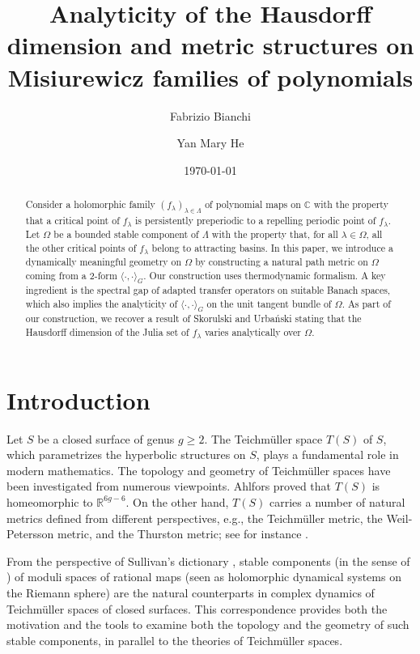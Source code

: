 \documentclass[11pt]{amsart}
\title{Analyticity of the Hausdorff dimension and 
metric structures on Misiurewicz families of polynomials}
\author{Fabrizio Bianchi}
\author{Yan Mary He}
\date{\today}
\theoremstyle{plain}
\theoremstyle{definition}
\theoremstyle{remark}
\begin{document}
\begin{abstract}
Consider a holomorphic
family
$(f_\lambda)_{\lambda \in \Lambda}$
of polynomial
maps on $\mathbb C$
with the property that a critical point of $f_\lambda$ is persistently preperiodic to a repelling periodic point of $f_\lambda$.
Let $\Omega$ be a bounded stable component of $\Lambda$ with the property that, for all $\lambda \in \Omega$, all the other critical points of $f_\lambda$
belong to attracting basins. 
In this paper, we introduce a dynamically meaningful 
geometry on $\Omega$ by constructing a natural path metric on $\Omega$ coming from a
2-form $\langle \cdot, \cdot \rangle_G$. Our construction uses thermodynamic formalism. A key ingredient is the
spectral gap of adapted transfer operators on suitable Banach spaces, which also implies the analyticity of $\langle \cdot, \cdot \rangle_G$ on the unit tangent bundle of $\Omega$.
As part of our construction, we recover
a result of Skorulski and
Urba{\'n}ski stating
that the Hausdorff dimension of the Julia set of $f_\lambda$
varies analytically over $\Omega$.
\end{abstract}

\maketitle

\section{Introduction}
Let $S$ be a closed surface of genus 
$g \geq 2$.
The Teichm\"uller space $T(S)$ of $S$, which parametrizes the hyperbolic structures on $S$, plays a fundamental role in modern mathematics.
The topology and geometry of
Teichm\"uller spaces
have been investigated from numerous viewpoints. Ahlfors 
\cite{Ahlfors_QCMappings}
proved that 
$T(S)$ is homeomorphic to $\mathbb R^{6g-6}$.
On the other hand, $T(S)$
carries a number of natural metrics defined from different perspectives, e.g., the Teichm\"uller metric, the Weil-Petersson metric, and the Thurston metric; see
for instance \cite{Hubbard06,ImaTan}. 

From the perspective of Sullivan's dictionary \cite{Sullivan85, McMullen94, DSU17},
stable components
(in the sense of \cite{Lyu83typical,MSS83})
of moduli spaces of 
rational maps (seen as holomorphic dynamical systems on the Riemann sphere) are the natural counterparts in complex dynamics of Teichm\"uller spaces of closed surfaces. This correspondence provides both the motivation and the tools to examine
both the topology and the geometry 
of such stable components, in parallel to the theories of Teichm\"uller spaces.
\end{document}
